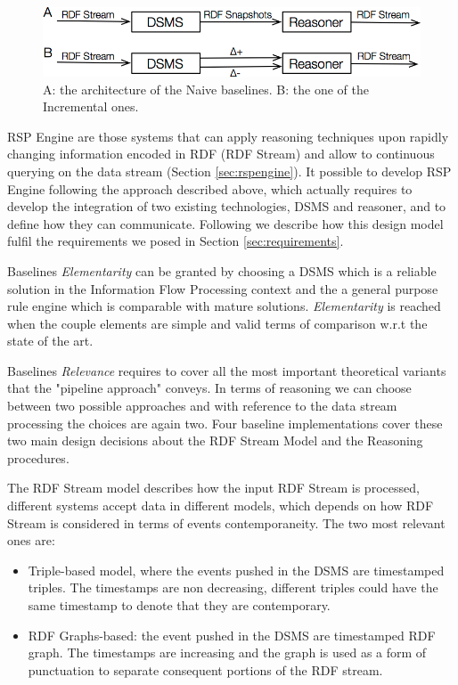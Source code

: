 \begin{figure}[tbh]
  \centering
	\includegraphics[width=\linewidth]{images/baselines-final}
	\caption{A: the architecture of the Naive baselines. B: the one of  the Incremental ones.} 
  	\label{fig:baselines}
\end{figure}

\noindent RSP Engine are those systems that can apply reasoning techniques upon rapidly changing information encoded in RDF (RDF Stream) and allow to continuous querying on the data stream (Section \ref{sec:rspengine}). It possible to develop RSP Engine following the approach described above, which actually requires to develop the integration of two existing technologies, DSMS and reasoner, and to define how they can communicate. Following we describe how this design model fulfil the requirements we posed in Section \ref{sec:requirements}.

Baselines \textit{Elementarity} can be granted by choosing a DSMS which is a reliable solution in the Information Flow Processing context and the a general purpose rule engine which is comparable with mature solutions. \textit{Elementarity} is reached when the couple elements are simple and valid terms of comparison w.r.t the state of the art.

Baselines \textit{Relevance} requires to cover all the most important theoretical variants that the "pipeline approach" conveys. In terms of reasoning we can choose between two possible approaches and with reference to the data stream processing the choices are again two. Four baseline implementations cover these two main design decisions about the RDF Stream Model and the Reasoning procedures. 

The RDF Stream model describes how the input RDF Stream is processed, different systems accept data in different models, which depends on how RDF Stream is considered in terms of events contemporaneity. The two most relevant ones are:

\begin{itemize}	
\item Triple-based model, where the events pushed in the DSMS are timestamped triples. The timestamps are non decreasing, different triples could have the same timestamp to denote that they are contemporary.
\item RDF Graphs-based: the event pushed in the DSMS are timestamped RDF graph. The timestamps are increasing and the graph is used as a form of punctuation \cite{Tatbul2003b} to separate consequent portions of the RDF stream.
\end{itemize}

